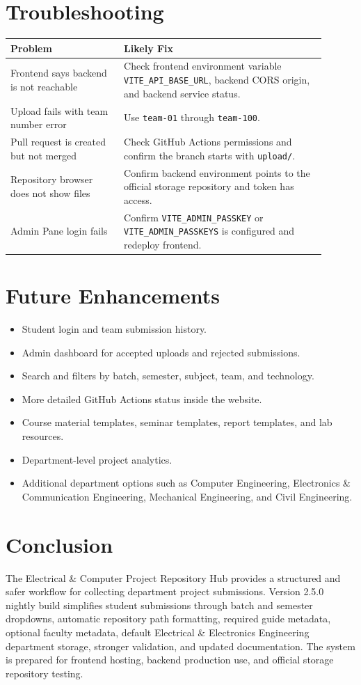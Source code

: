 \documentclass[12pt,a4paper]{article}
\begin{document}
\section{Troubleshooting}

\begin{longtable}{p{0.32\linewidth} p{0.58\linewidth}}
\toprule
\textbf{Problem} & \textbf{Likely Fix} \\
\midrule
Frontend says backend is not reachable & Check frontend environment variable \texttt{VITE\_API\_BASE\_URL}, backend CORS origin, and backend service status. \\
Upload fails with team number error & Use \texttt{team-01} through \texttt{team-100}. \\
Pull request is created but not merged & Check GitHub Actions permissions and confirm the branch starts with \texttt{upload/}. \\
Repository browser does not show files & Confirm backend environment points to the official storage repository and token has access. \\
Admin Pane login fails & Confirm \texttt{VITE\_ADMIN\_PASSKEY} or \texttt{VITE\_ADMIN\_PASSKEYS} is configured and redeploy frontend. \\
\bottomrule
\end{longtable}

\section{Future Enhancements}

\begin{itemize}[leftmargin=*]
    \item Student login and team submission history.
    \item Admin dashboard for accepted uploads and rejected submissions.
    \item Search and filters by batch, semester, subject, team, and technology.
    \item More detailed GitHub Actions status inside the website.
    \item Course material templates, seminar templates, report templates, and lab resources.
    \item Department-level project analytics.
    \item Additional department options such as Computer Engineering, Electronics \& Communication Engineering, Mechanical Engineering, and Civil Engineering.
\end{itemize}

\section{Conclusion}

The Electrical \& Computer Project Repository Hub provides a structured and safer workflow for collecting department project submissions. Version 2.5.0 nightly build simplifies student submissions through batch and semester dropdowns, automatic repository path formatting, required guide metadata, optional faculty metadata, default Electrical \& Electronics Engineering department storage, stronger validation, and updated documentation. The system is prepared for frontend hosting, backend production use, and official storage repository testing.
\end{document}
